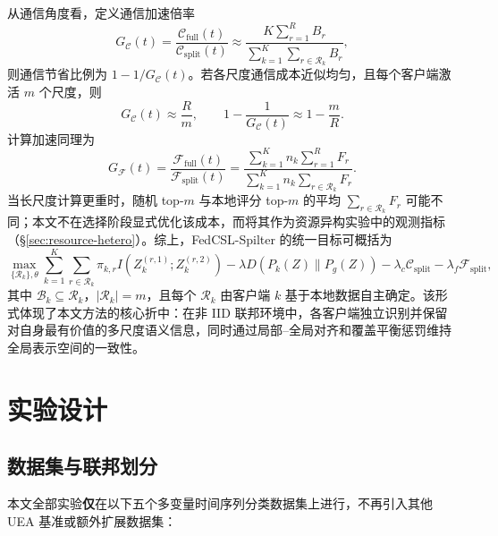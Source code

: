 \documentclass{article}
\begin{document}
从通信角度看，定义通信加速倍率
\begin{equation}
G_{\mathcal{C}}(t)=
\frac{\mathcal{C}_{\mathrm{full}}(t)}
{\mathcal{C}_{\mathrm{split}}(t)}
\approx
\frac{K\sum_{r=1}^{R}B_r}
{\sum_{k=1}^{K}\sum_{r\in\mathcal{R}_k}B_r},
\end{equation}
则通信节省比例为 $1-1/G_{\mathcal{C}}(t)$。若各尺度通信成本近似均匀，且每个客户端激活 $m$ 个尺度，则
\begin{equation}
G_{\mathcal{C}}(t)\approx \frac{R}{m},
\qquad
1-\frac{1}{G_{\mathcal{C}}(t)}\approx 1-\frac{m}{R}.
\end{equation}
计算加速同理为
\begin{equation}
G_{\mathcal{F}}(t)=
\frac{\mathcal{F}_{\mathrm{full}}(t)}
{\mathcal{F}_{\mathrm{split}}(t)}
=
\frac{\sum_{k=1}^{K}n_k\sum_{r=1}^{R}F_r}
{\sum_{k=1}^{K}n_k\sum_{r\in\mathcal{R}_k}F_r}.
\end{equation}
当长尺度计算更重时，随机 top-$m$ 与本地评分 top-$m$ 的平均 $\sum_{r\in\mathcal{R}_k}F_r$ 可能不同；本文不在选择阶段显式优化该成本，而将其作为资源异构实验中的观测指标（§\ref{sec:resource-hetero}）。综上，FedCSL-Spilter 的统一目标可概括为
\begin{equation}
\max_{\{\mathcal{R}_k\},\theta}
\sum_{k=1}^{K}
\sum_{r\in\mathcal{R}_k}
\pi_{k,r}
I\!\left(Z_k^{(r,1)};Z_k^{(r,2)}\right)
-\lambda D\!\left(P_k(Z)\|P_g(Z)\right)
-\lambda_c\mathcal{C}_{\mathrm{split}}
-\lambda_f\mathcal{F}_{\mathrm{split}},
\end{equation}
其中 $\mathcal{B}_k\subseteq\mathcal{R}_k$，$|\mathcal{R}_k|=m$，且每个 $\mathcal{R}_k$ 由客户端 $k$ 基于本地数据自主确定。该形式体现了本文方法的核心折中：在非 IID 联邦环境中，各客户端独立识别并保留对自身最有价值的多尺度语义信息，同时通过局部--全局对齐和覆盖平衡惩罚维持全局表示空间的一致性。

\section{实验设计}

\subsection{数据集与联邦划分}

本文全部实验\textbf{仅}在以下五个多变量时间序列分类数据集上进行，不再引入其他 UEA 基准或额外扩展数据集：
\end{document}
